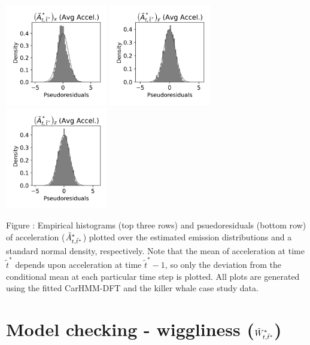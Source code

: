 \documentclass{article}
\begin{document}
\begin{center}
        \includegraphics[width=1.75in]{../Plots/2019/20190902-182840-CATs_OB_1_0_267_CarHMM_pseudresids_Ax.png}
        \includegraphics[width=1.75in]{../Plots/2019/20190902-182840-CATs_OB_1_0_267_CarHMM_pseudresids_Ay.png}
        \includegraphics[width=1.75in]{../Plots/2019/20190902-182840-CATs_OB_1_0_267_CarHMM_pseudresids_Az.png}
        \end{center}
        
        \noindent Figure : Empirical histograms (top three rows) and psuedoresiduals (bottom row) of acceleration ($\tilde{A}^*_{t,\tilde t^*}$) plotted over the estimated emission distributions and a standard normal density, respectively. Note that the mean of acceleration at time $\tilde t^*$ depends upon acceleration at time $\tilde t^*-1$, so only the deviation from the conditional mean at each particular time step is plotted. All plots are generated using the fitted CarHMM-DFT and the killer whale case study data.
        \addtocounter{fignum}{1}
        
    \section{Model checking - wiggliness ($\tilde{W}^*_{t,\tilde t^*}$)}
        
\end{document}
